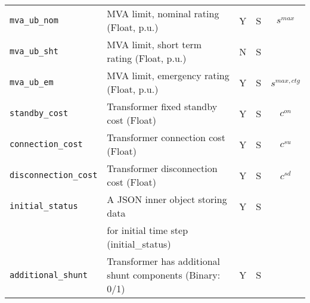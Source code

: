 \documentclass{article}
\begin{document}
\begin{center}
\begin{tabular}{ l | l | c | c | c |}
  {\tt mva\_ub\_nom} & MVA limit, nominal rating (Float, p.u.) & Y & S & $s^{max}$ \\
  {\tt mva\_ub\_sht} & MVA limit, short term rating (Float, p.u.) & N & S &  \\
  {\tt mva\_ub\_em} & MVA limit, emergency rating (Float, p.u.) & Y & S & $s^{max,ctg}$ \\

  {\tt standby\_cost} & Transformer fixed standby cost (Float) & Y & S & $c^{on}$\\
  {\tt connection\_cost} &  Transformer connection cost (Float) & Y & S & $c^{su}$\\
  {\tt disconnection\_cost} & Transformer disconnection cost (Float) & Y & S & $c^{sd}$\\
  {\tt initial\_status} & A JSON inner object storing data  & Y & S &  \\
       & for initial time step (initial\_status) &  &  &  \\
  {\tt additional\_shunt} & Transformer has additional shunt components (Binary: 0/1)& Y & S & \\
  \hline
\end{tabular}
\end{center}
  
  
  
\end{document}
